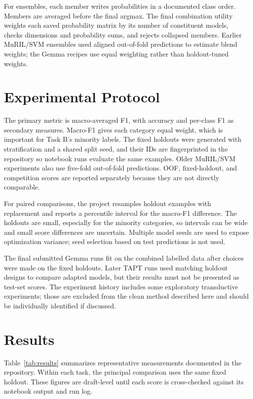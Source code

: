 \documentclass[10pt]{article}
\newcommand{\taskb}{Task B}
\begin{document}
For ensembles, each member writes probabilities in a documented class order.
Members are averaged before the final argmax. The final combination utility
weights each saved probability matrix by its number of constituent models,
checks dimensions and probability sums, and rejects collapsed members. Earlier
MuRIL/SVM ensembles used aligned out-of-fold predictions to estimate blend
weights; the Gemma recipes use equal weighting rather than holdout-tuned weights.

\section{Experimental Protocol}
The primary metric is macro-averaged F1, with accuracy and per-class F1 as
secondary measures. Macro-F1 gives each category equal weight, which is
important for \taskb{}'s minority labels. The fixed holdouts were generated
with stratification and a shared split seed, and their IDs are fingerprinted in
the repository so notebook runs evaluate the same examples. Older MuRIL/SVM
experiments also use five-fold out-of-fold predictions. OOF, fixed-holdout,
and competition scores are reported separately because they are not directly
comparable.

For paired comparisons, the project resamples holdout examples with replacement
and reports a percentile interval for the macro-F1 difference. The holdouts are
small, especially for the minority categories, so intervals can be wide and
small score differences are uncertain. Multiple model seeds are used to expose
optimization variance; seed selection based on test predictions is not used.

The final submitted Gemma runs fit on the combined labelled data after choices
were made on the fixed holdouts. Later TAPT runs used matching holdout designs
to compare adapted models, but their results must not be presented as test-set
scores. The experiment history includes some exploratory transductive
experiments; those are excluded from the clean method described here and should
be individually identified if discussed.

\section{Results}
Table~\ref{tab:results} summarizes representative measurements documented in
the repository. Within each task, the principal comparison uses the same fixed
holdout. These figures are draft-level until each score is cross-checked against
its notebook output and run log.
\end{document}

